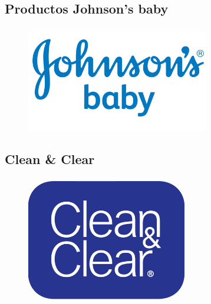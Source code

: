 \documentclass[compress, aspectratio=169]{beamer} %
\begin{document}
	\subsection{Productos Johnson's baby}
		\begin{frame}
	\transdissolve[duration=1]

			\frametitle{\insertsubsection}
			
			\begin{figure}
			   \center\includegraphics[width=8cm]{baby.jpeg}				
			\end{figure}
			
			
		\end{frame}
		
		\subsection{Clean \& Clear}
			\begin{frame}
	\transdissolve[duration=1]

				\frametitle{\insertsubsection}
				
			\begin{figure}
			   \center\includegraphics[width=7cm]{clean.jpeg}				
			\end{figure}
			
				
			\end{frame}
	
\end{document}
